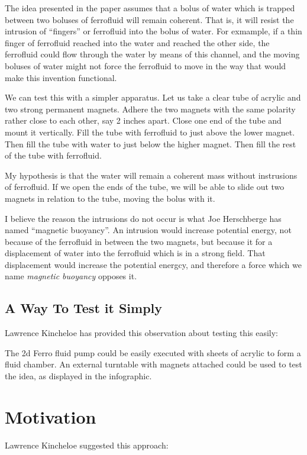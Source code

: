 \documentclass[12pt]{article}
\begin{document}
The idea presented in the paper assumes that a bolus of water which is trapped
between two boluses of ferrofluid will remain coherent. That is, it will
resist the intrusion of ``fingers'' or ferrofluid into the bolus of water.
For exmample, if a thin finger of ferrofluid reached into the water and
reached the other side, the ferrofluid could flow through the water by means
of this channel, and the moving boluses of water might not force the
ferrofluid to move in the way that would make this invention functional.

We can test this with a simpler apparatus.
Let us take a clear tube of acrylic and two strong permanent magnets.
Adhere the two magnets with the same polarity rather close to each other,
say 2 inches apart.
Close one end of the tube and mount it vertically.
Fill the tube with ferrofluid to just above the lower magnet.
Then fill the tube with water to just below the higher magnet.
Then fill the rest of the tube with ferrofluid.

My hypothesis is that the water will remain a coherent mass without
instrusions of ferrofluid. If we open the ends of the tube, we will
be able to slide out two magnets in relation to the tube, moving the
bolus with it.

I believe the reason the intrusions do not occur is what
Joe Herschberge has named ``magnetic buoyancy''. An intrusion
would increase potential energy, not because of the ferrofluid
in between the two magnets, but because it for a displacement of
water into the ferrofluid which is in a strong field.
That displacement would increase the potential energcy, and
therefore a force which we name {\em magnetic buoyancy} opposes it.

\subsection{A Way To Test it Simply}

Lawrence Kincheloe has provided this observation about testing this easily:


The 2d Ferro fluid pump could be easily executed with sheets of acrylic to form a fluid chamber. An external turntable with magnets attached could be used to test the idea, as displayed in the infographic.

\section{Motivation}

Lawrence Kincheloe suggested this approach:
\end{document}
